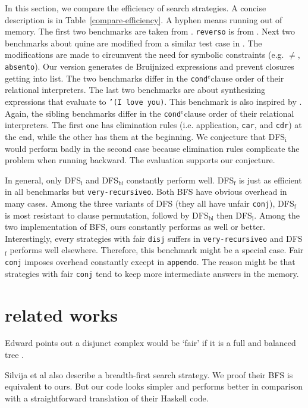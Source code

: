 \documentclass[format=acmlarge, review=true, authordraft=true]{acmart}
\newcommand{\conde}{\texttt{cond$^e$}}
\newcommand{\conj}{\texttt{conj}}
\newcommand{\disj}{\texttt{disj}}
\begin{document}
In this section, we compare the efficiency of search strategies. A concise 
description is in Table~\ref{compare-efficiency}. A hyphen means running out of 
memory. The first two benchmarks are taken from 
\citet{friedman_reasoned_2018}. \texttt{reverso} is from 
\citet{rozplokhas2018improving}. Next two benchmarks 
about quine are modified from a similar test case in \citet{byrd2017unified}. 
The modifications are made 
to circumvent the need for symbolic constraints (e.g. $\neq$, 
\texttt{absento}). Our version generates de 
Bruijnized expressions and prevent closures getting into list. The two 
benchmarks differ in the \conde clause order of their relational interpreters. 
The last two 
benchmarks are about synthesizing expressions that evaluate to \texttt{'(I love 
you)}. This benchmark is also inspired by \citet{byrd2017unified}. Again, the 
sibling benchmarks differ in the \conde clause order of their relational 
interpreters. The first one 
has elimination rules (i.e. application, \texttt{car}, and \texttt{cdr}) at the 
end, while the other has them at the beginning. We conjecture that DFS$_\textrm{i}$ would 
perform badly in the second case because elimination rules complicate the 
problem when running backward. The evaluation supports our conjecture.

In general, only DFS$_\textrm{i}$ and DFS$_\textrm{bi}$ constantly perform well. DFS$_\textrm{f}$ is just as 
efficient in all benchmarks but \texttt{very-recursiveo}. Both BFS have obvious 
overhead in many cases. Among the three variants of DFS (they all have unfair 
\conj{}), DFS$_\textrm{f}$ is most resistant to clause permutation, followd by DFS$_\textrm{bi}$ then 
DFS$_\textrm{i}$. Among the two implementation of BFS, ours constantly performs as well or 
better. Interestingly, every strategies with fair \disj{} suffers in 
\texttt{very-recursiveo} and DFS$_\textrm{f}$ performs well elsewhere. 
Therefore, this 
benchmark might be a special case. Fair \conj{} imposes overhead constantly 
except in \texttt{appendo}. The reason might be that strategies with fair 
\conj{} tend to keep more intermediate answers in the memory.

\section{related works}

Edward points out a disjunct complex would be `fair' if it is a full and 
balanced tree \citet{yang2010adventures}.

Silvija et al \citet{seres1999algebra} also describe a breadth-first search 
strategy. We proof their BFS is equivalent to ours. But our code looks simpler 
and performs better in comparison with a straightforward translation of their 
Haskell code.
\end{document}
